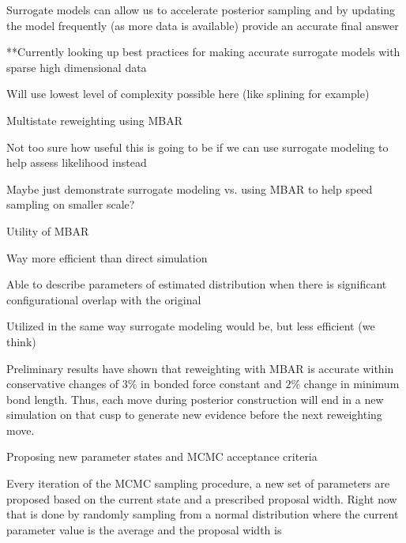 \documentclass{report}
\begin{document}
\begin{outline}
\begin{outline}
\begin{outline}
\begin{outline}
\begin{outline}
          \item{Surrogate models can allow us to accelerate posterior sampling and by updating the model frequently (as more data is available) provide an 
                  accurate final answer}
          \item{**Currently looking up best practices for making accurate surrogate models with sparse high dimensional data}
          \item{Will use lowest level of complexity possible here (like splining for example)}
        \end{outline}
      \end{outline}
      \item{Multistate reweighting using MBAR}
      \begin{outline}
        \item{Not too sure how useful this is going to be if we can use surrogate modeling to help assess likelihood instead}
        \item{Maybe just demonstrate surrogate modeling vs. using MBAR to help speed sampling on smaller scale?}
        \item{Utility of MBAR}
        \begin{outline}
          \item{Way more efficient than direct simulation}
          \item{Able to describe parameters of estimated distribution when there is significant configurational overlap with the original}
        \end{outline}
        \item{Utilized in the same way surrogate modeling would be, but less efficient (we think)}
        \item{Preliminary results have shown that reweighting with MBAR is accurate within conservative changes of $3\%$ in bonded force constant and $2\%$
                change in minimum bond length. Thus, each move during posterior construction will end in a new simulation on that cusp to generate new 
                evidence before the next reweighting move.}
      \end{outline}
      \item{Proposing new parameter states and MCMC acceptance criteria}
      \begin{outline}
        \item{Every iteration of the MCMC sampling procedure, a new set of parameters are proposed based on the current state and a prescribed proposal width.
              Right now that is done by randomly sampling from a normal distribution where the current parameter value is the average and the proposal width is
}
\end{outline}
\end{outline}
\end{outline}
\end{outline}
\end{document}
